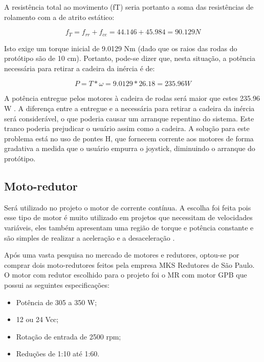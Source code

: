 A resistência total ao movimento (fT) seria portanto a soma das resistências de rolamento com a de atrito estático:

\begin{equation}
f_T = f_{rr} + f_{ce} = 44.146+45.984 = 90.129 N
\end{equation}

Isto exige um torque inicial de 9.0129 Nm (dado que os raios das rodas do protótipo são de 10 cm). Portanto, pode-se dizer que, nesta situação, a potência necessária para retirar a cadeira da inércia é de:

\begin{equation}
P = T*\omega = 9.0129*26.18 = 235.96 W
\end{equation}

  A potência entregue pelos motores à cadeira de rodas será maior que estes 235.96 W . A diferença entre a entregue e a necessária para retirar a cadeira da inércia será considerável, o que poderia causar um arranque repentino do sistema. Este tranco poderia prejudicar o usuário assim como a cadeira. A solução para este problema está no uso de pontes H, que fornecem corrente aos motores de forma gradativa a medida que o usuário empurra o joystick, diminuindo o arranque do protótipo.

  \subsection{Moto-redutor}

  Será utilizado no projeto o motor de corrente contínua. A escolha foi feita pois esse tipo de motor é muito utilizado em projetos que necessitam de velocidades variáveis, eles também apresentam uma região de torque e potência constante e são simples de realizar a aceleração e a desaceleração \cite{manual_bateria_unipower}.

  Após uma vasta pesquisa no mercado de motores e redutores, optou-se por comprar dois moto-redutores feitos pela empresa MKS Redutores de São Paulo. O motor com redutor escolhido para o projeto foi o MR com motor GPB que possui as seguintes especificações:

  \begin{itemize}
    \item Potência de 305 a 350 W;
    \item 12 ou 24 Vcc;
    \item Rotação de entrada de 2500 rpm;
    \item Reduções de 1:10 até 1:60.
  \end{itemize}

